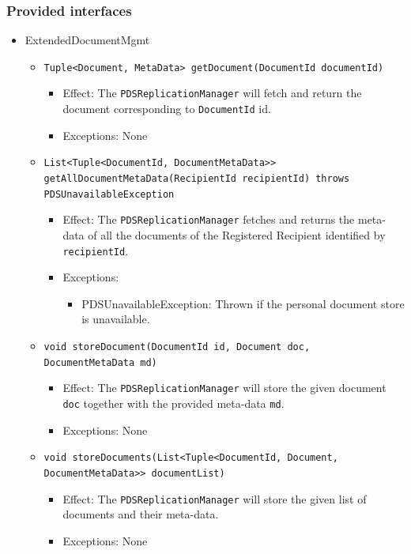 \documentclass[a4paper,10pt]{article}
\begin{document}
\subsubsection*{Provided interfaces}
\begin{itemize}
    \item  ExtendedDocumentMgmt
    \begin{itemize}
        \item \texttt{Tuple<Document, MetaData> getDocument(DocumentId documentId)}
        \begin{itemize}
            \item Effect: The \texttt{PDSReplicationManager} will fetch and return the document corresponding to \texttt{DocumentId} id.
            \item Exceptions: None
         \end{itemize}
         
         
         
         \item \texttt{List<Tuple<DocumentId, DocumentMetaData>> getAllDocumentMetaData(RecipientId recipientId) throws PDSUnavailableException}
        \begin{itemize}
            \item Effect: The \texttt{PDSReplicationManager} fetches and returns the meta-data of all the documents of the Registered Recipient identified by \texttt{recipientId}.
            \item Exceptions:
            \begin{itemize}
                \item PDSUnavailableException: Thrown if the personal document store is unavailable.
            \end{itemize}
         \end{itemize}
 
		\item \texttt{void storeDocument(DocumentId id, Document doc, DocumentMetaData md)}
        \begin{itemize}
            \item Effect: The \texttt{PDSReplicationManager} will store the given document \texttt{doc} together with the provided meta-data \texttt{md}.
            \item Exceptions:  None 
        \end{itemize}
         
         \item \texttt{void storeDocuments(List<Tuple<DocumentId, Document, DocumentMetaData>> documentList)}
         \begin{itemize}
                \item Effect: The \texttt{PDSReplicationManager} will store the given list of documents and their meta-data.
                \item Exceptions: None
         \end{itemize}
    \end{itemize}
\end{itemize}
\end{document}
